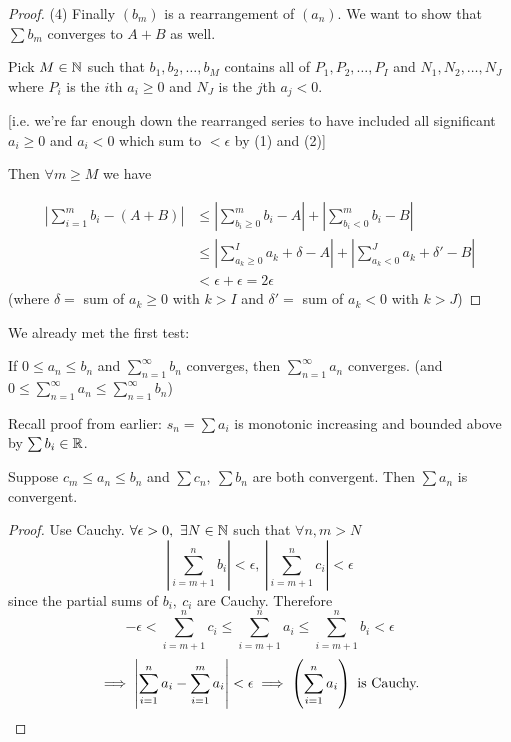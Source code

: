 \documentclass[twoside]{scrartcl}
\begin{document}
\begin{proof}
(4) Finally $(b_m)$ is a rearrangement of $(a_n)$. We want to show that $\sum b_m$ converges to $A+B$ as well. 

Pick $M \in\mathbb{N}$ such that $b_1,b_2,\dots,b_M$ contains all of $P_1,P_2,\dots,P_I$ and $N_1,N_2,\dots,N_J$ where $P_i$ is the $i$th $a_i \geq 0$ and $N_J$ is the $j$th $a_j <0$. 

[i.e. we're far enough down the rearranged series to have included all significant $a_i \geq 0$ and $a_i <0$ which sum to $<\epsilon$ by (1) and (2)]

Then $\forall m \geq M$ we have

\[\begin{aligned}
\left|\sum_{i=1}^m b_i - (A+B)\right| 
&\leq \left|\sum_{b_i \geq 0}^m b_i - A\right| + \left|\sum_{b_i < 0}^m b_i - B\right|\\
&\leq \left|\sum_{a_k \geq 0}^I a_k + \delta - A\right| + \left|\sum_{a_k < 0}^J a_k +\delta' - B\right|\\
&< \epsilon + \epsilon = 2\epsilon 
\end{aligned}
\]
(where $\delta =$ sum of $a_k \geq 0$ with $k >I$ and $\delta' =$ sum of $a_k < 0$ with $k > J$) \end{proof}


\setcounter{equation}{4}
We already met the first test:
\begin{theorem}[Comparison I]
If $0 \leq a_n \leq b_n$ and $\sum_{n=1}^{\infty} b_n$ converges, then $\sum_{n=1}^{\infty} a_n$ converges.	 (and $0 \leq \sum_{n=1}^{\infty}a_n \leq \sum_{n=1}^{\infty}b_n$)
\end{theorem}

Recall proof from earlier: $s_n = \sum a_i$ is monotonic increasing and bounded above by $\sum b_i \in \mathbb{R}$.\\

\setcounter{equation}{17}
\begin{theorem}
	Suppose $c_m \leq a_n \leq b_n$ and $\sum c_n,~\sum b_n$ are both convergent. Then $\sum a_n$ is convergent.
\end{theorem}
\begin{proof}
Use Cauchy. $\forall \epsilon >0,~ \exists N \in \mathbb{N}$ such that $\forall n,m > N$
\[\left|\sum_{i=m+1}^n b_i\right| < \epsilon,~\left|\sum_{i=m+1}^n c_i\right| < \epsilon\] since the partial sums of $b_i,~c_i$ are Cauchy. Therefore
\[-\epsilon <\sum_{i=m+1}^n c_i \leq \sum_{i=m+1}^n a_i \leq \sum_{i=m+1}^n b_i < \epsilon   \]
\[\implies \left|\sum_{i=1}^{n} a_i - \sum_{i=1}^m a_i\right| < \epsilon \implies \left(\sum_{i=1}^{n} a_i \right) \text{ is Cauchy.} \qedhere\]
\end{proof}\vspace*{5pt}
\end{document}
